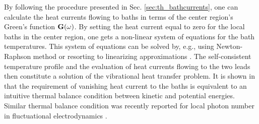By following the procedure presented in Sec. \ref{sec:th_bathcurrents}, one can calculate the heat currents flowing to baths in terms of the center region's Green's function $\mathbf{G}(\omega)$. By setting the heat current equal to zero for the local baths in the center region, one gets a non-linear system of equations for the bath temperatures. This system of equations can be solved by, e.g., using Newton-Raphson method \cite{bandyopadhyay11} or resorting to linearizing approximations \cite{segal09}. The self-consistent temperature profile and the evaluation of heat currents flowing to the two leads then constitute a solution of the vibrational heat transfer problem. It is shown in  that the requirement of vanishing heat current to the baths is equivalent to an intuitive thermal balance condition between kinetic and potential energies. Similar thermal balance condition was recently reported for local photon number in fluctuational electrodynamics \cite{partanen14}. %



% 



